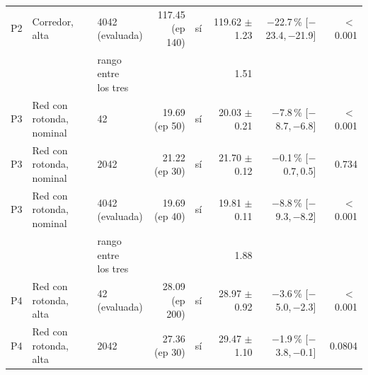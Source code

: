 \begin{table}[H]
\begin{tabular}{lllrlrrr}
P2 & \makecell[l]{Corredor,\\{}alta} & \makecell[l]{4042\\{}(evaluada)} & \makecell[r]{117.45\\{}(ep 140)} & sí & \makecell[r]{119.62\\{}$\pm$ 1.23} & \makecell[r]{$-$22.7\,\%\\{}[$-$23.4,\,$-$21.9]} & $<$\,0.001 \\
 & & \makecell[l]{rango entre\\{}los tres} & & & 1.51 & & \\
P3 & \makecell[l]{Red con rotonda,\\{}nominal} & 42 & \makecell[r]{19.69\\{}(ep 50)} & sí & \makecell[r]{20.03\\{}$\pm$ 0.21} & \makecell[r]{$-$7.8\,\%\\{}[$-$8.7,\,$-$6.8]} & $<$\,0.001 \\
P3 & \makecell[l]{Red con rotonda,\\{}nominal} & 2042 & \makecell[r]{21.22\\{}(ep 30)} & sí & \makecell[r]{21.70\\{}$\pm$ 0.12} & \makecell[r]{$-$0.1\,\%\\{}[$-$0.7,\,0.5]} & 0.734 \\
P3 & \makecell[l]{Red con rotonda,\\{}nominal} & \makecell[l]{4042\\{}(evaluada)} & \makecell[r]{19.69\\{}(ep 40)} & sí & \makecell[r]{19.81\\{}$\pm$ 0.11} & \makecell[r]{$-$8.8\,\%\\{}[$-$9.3,\,$-$8.2]} & $<$\,0.001 \\
 & & \makecell[l]{rango entre\\{}los tres} & & & 1.88 & & \\
P4 & \makecell[l]{Red con rotonda,\\{}alta} & \makecell[l]{42\\{}(evaluada)} & \makecell[r]{28.09\\{}(ep 200)} & sí & \makecell[r]{28.97\\{}$\pm$ 0.92} & \makecell[r]{$-$3.6\,\%\\{}[$-$5.0,\,$-$2.3]} & $<$\,0.001 \\
P4 & \makecell[l]{Red con rotonda,\\{}alta} & 2042 & \makecell[r]{27.36\\{}(ep 30)} & sí & \makecell[r]{29.47\\{}$\pm$ 1.10} & \makecell[r]{$-$1.9\,\%\\{}[$-$3.8,\,$-$0.1]} & 0.0804 \\

\end{tabular}
\end{table}
